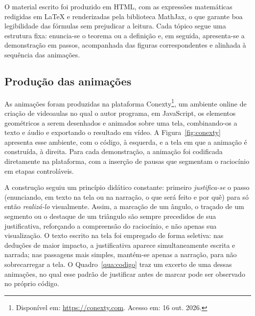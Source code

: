 O material escrito foi produzido em HTML, com as expressões matemáticas redigidas em \LaTeX{} e renderizadas pela biblioteca MathJax, o que garante boa legibilidade das fórmulas sem prejudicar a leitura. Cada tópico segue uma estrutura fixa: enuncia-se o teorema ou a definição e, em seguida, apresenta-se a demonstração em passos, acompanhada das figuras correspondentes e alinhada à sequência das animações.

\subsection{Produção das animações}

As animações foram produzidas na plataforma Conexty\footnote{Disponível em: \url{https://conexty.com}. Acesso em: 16 out. 2026.}, um ambiente online de criação de videoaulas no qual o autor programa, em JavaScript, os elementos geométricos a serem desenhados e animados sobre uma tela, combinando-os a texto e áudio e exportando o resultado em vídeo. A Figura~\ref{fig:conexty} apresenta esse ambiente, com o código, à esquerda, e a tela em que a animação é construída, à direita. Para cada demonstração, a animação foi codificada diretamente na plataforma, com a inserção de pausas que segmentam o raciocínio em etapas controláveis.


A construção seguiu um princípio didático constante: primeiro \emph{justifica-se} o passo (enunciando, em texto na tela ou na narração, o que será feito e por quê) para só então \emph{realizá-lo} visualmente. Assim, a marcação de um ângulo, o traçado de um segmento ou o destaque de um triângulo são sempre precedidos de sua justificativa, reforçando a compreensão do raciocínio, e não apenas sua visualização. O texto escrito na tela foi empregado de forma seletiva: nas deduções de maior impacto, a justificativa aparece simultaneamente escrita e narrada; nas passagens mais simples, mantém-se apenas a narração, para não sobrecarregar a tela. O Quadro~\ref{qua:codigo} traz um excerto de uma dessas animações, no qual esse padrão de justificar antes de marcar pode ser observado no próprio código.


